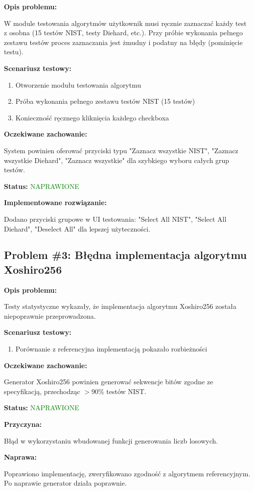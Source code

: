 \documentclass[12pt,a4paper]{article}
\begin{document}
\begin{tcolorbox}[colback=red!5!white,colframe=red!75!black,title=Błąd UI - Priorytet: WYSOKI]
\textbf{Opis problemu:}

W module testowania algorytmów użytkownik musi ręcznie zaznaczać każdy test z osobna (15 testów NIST, testy Diehard, etc.). Przy próbie wykonania pełnego zestawu testów proces zaznaczania jest żmudny i podatny na błędy (pominięcie testu).

\textbf{Scenariusz testowy:}
\begin{enumerate}
    \item Otworzenie modułu testowania algorytmu
    \item Próba wykonania pełnego zestawu testów NIST (15 testów)
    \item Konieczność ręcznego kliknięcia każdego checkboxa
\end{enumerate}

\textbf{Oczekiwane zachowanie:}

System powinien oferować przyciski typu "Zaznacz wszystkie NIST", "Zaznacz wszystkie Diehard", "Zaznacz wszystkie" dla szybkiego wyboru całych grup testów.

\textbf{Status:} \textcolor{green}{NAPRAWIONE}

\textbf{Implementowane rozwiązanie:}

Dodano przyciski grupowe w UI testowania: "Select All NIST", "Select All Diehard", "Deselect All" dla lepszej użyteczności.
\end{tcolorbox}

\subsection{Problem \#3: Błędna implementacja algorytmu Xoshiro256}

\begin{tcolorbox}[colback=orange!10!white,colframe=orange!75!black,title=Błąd funkcjonalny - Priorytet: KRYTYCZNY]
\textbf{Opis problemu:}

Testy statystyczne wykazały, że implementacja algorytmu Xoshiro256 została niepoprawnie przeprowadzona.

\textbf{Scenariusz testowy:}
\begin{enumerate}
    \item Porównanie z referencyjna implementacją pokazało rozbieżności
\end{enumerate}

\textbf{Oczekiwane zachowanie:}

Generator Xoshiro256 powinien generować sekwencje bitów zgodne ze specyfikacją, przechodząc $>$90\% testów NIST.

\textbf{Status:} \textcolor{green}{NAPRAWIONE}

\textbf{Przyczyna:}

Błąd w wykorzystaniu wbudowanej funkcji generowania liczb losowych.

\textbf{Naprawa:}

Poprawiono implementację, zweryfikowano zgodność z algorytmem referencyjnym. Po naprawie generator działa poprawnie.
\end{tcolorbox}
\end{document}
